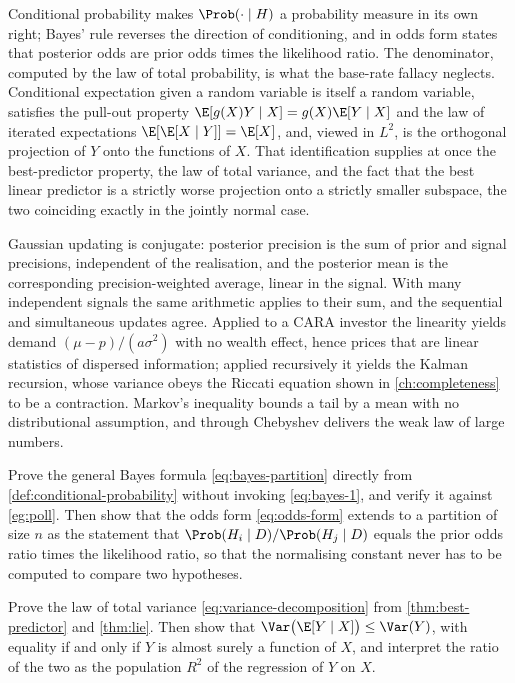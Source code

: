 Conditional probability makes $\Prob(\cdot\mid H)$ a probability measure in its
own right; Bayes' rule reverses the direction of conditioning, and in odds form
states that posterior odds are prior odds times the likelihood ratio. The
denominator, computed by the law of total probability, is what the base-rate
fallacy neglects. Conditional expectation given a random variable is itself a
random variable, satisfies the pull-out property
$\E[g(X)Y\mid X]=g(X)\E[Y\mid X]$ and the law of iterated expectations
$\E[\E[X\mid Y]]=\E[X]$, and, viewed in $L^{2}$, is the orthogonal projection
of $Y$ onto the functions of $X$. That identification supplies at once the
best-predictor property, the law of total variance, and the fact that the best
linear predictor is a strictly worse projection onto a strictly smaller subspace,
the two coinciding exactly in the jointly normal case.

Gaussian updating is conjugate: posterior precision is the sum of prior and
signal precisions, independent of the realisation, and the posterior mean is the
corresponding precision-weighted average, linear in the signal. With many
independent signals the same arithmetic applies to their sum, and the sequential
and simultaneous updates agree. Applied to a CARA investor the linearity yields
demand $(\mu-p)/(a\sigma^{2})$ with no wealth effect, hence prices that are linear
statistics of dispersed information; applied recursively it yields the Kalman
recursion, whose variance obeys the Riccati equation shown in
\autoref{ch:completeness} to be a contraction. Markov's inequality bounds a tail
by a mean with no distributional assumption, and through Chebyshev delivers the
weak law of large numbers.

\begin{exercise}\label{ex:prob-1}
	Prove the general Bayes formula \eqref{eq:bayes-partition} directly from
	\autoref{def:conditional-probability} without invoking
	\eqref{eq:bayes-1}, and verify it against \autoref{eg:poll}. Then show that the
	odds form \eqref{eq:odds-form} extends to a partition of size $n$ as the
	statement that $\Prob(H_i\mid D)/\Prob(H_j\mid D)$ equals the prior odds
	ratio times the likelihood ratio, so that the normalising constant never has to
	be computed to compare two hypotheses.
\end{exercise}

\begin{exercise}\label{ex:prob-2}
	Prove the law of total variance \eqref{eq:variance-decomposition} from
	\autoref{thm:best-predictor} and \autoref{thm:lie}. Then show that
	$\Var\bigl(\E[Y\mid X]\bigr)\leq\Var(Y)$, with equality if and only if $Y$ is
	almost surely a function of $X$, and interpret the ratio of the two as the
	population $R^{2}$ of the regression of $Y$ on $X$.
\end{exercise}

